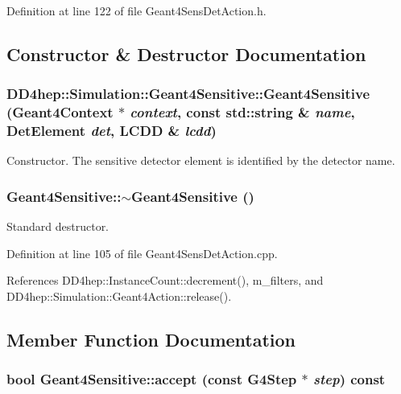 Definition at line 122 of file Geant4SensDetAction.h.

\subsection{Constructor \& Destructor Documentation}
\hypertarget{class_d_d4hep_1_1_simulation_1_1_geant4_sensitive_a906ab36a3a6b09cd5ad01afb6d21fdfe}{
\subsubsection[{Geant4Sensitive}]{\setlength{\rightskip}{0pt plus 5cm}DD4hep::Simulation::Geant4Sensitive::Geant4Sensitive ({\bf Geant4Context} $\ast$ {\em context}, \/  const std::string \& {\em name}, \/  {\bf DetElement} {\em det}, \/  {\bf LCDD} \& {\em lcdd})}}
\label{class_d_d4hep_1_1_simulation_1_1_geant4_sensitive_a906ab36a3a6b09cd5ad01afb6d21fdfe}


Constructor. The sensitive detector element is identified by the detector name. \hypertarget{class_d_d4hep_1_1_simulation_1_1_geant4_sensitive_ada2869ec6bcb9674eaa29f7e1c215729}{
\subsubsection[{$\sim$Geant4Sensitive}]{\setlength{\rightskip}{0pt plus 5cm}Geant4Sensitive::$\sim$Geant4Sensitive ()}}
\label{class_d_d4hep_1_1_simulation_1_1_geant4_sensitive_ada2869ec6bcb9674eaa29f7e1c215729}


Standard destructor. 

Definition at line 105 of file Geant4SensDetAction.cpp.

References DD4hep::InstanceCount::decrement(), m\_\-filters, and DD4hep::Simulation::Geant4Action::release().

\subsection{Member Function Documentation}
\hypertarget{class_d_d4hep_1_1_simulation_1_1_geant4_sensitive_a8c6552ef34cfdbc36601fbcb996418c5}{
\subsubsection[{accept}]{\setlength{\rightskip}{0pt plus 5cm}bool Geant4Sensitive::accept (const G4Step $\ast$ {\em step}) const}}
\label{class_d_d4hep_1_1_simulation_1_1_geant4_sensitive_a8c6552ef34cfdbc36601fbcb996418c5}


